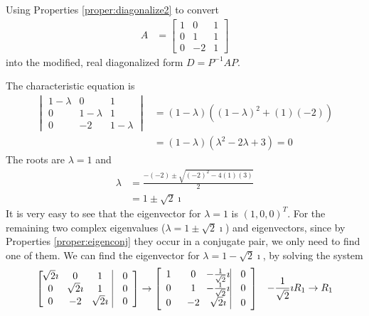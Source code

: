 \begin{exmp}
\label{ex8.2.2}
Using Properties \ref{proper:diagonalize2} to convert
\begin{align*}
A &= 
\begin{bmatrix}
1 & 0 & 1 \\
0 & 1 & 1 \\
0 & -2 & 1
\end{bmatrix}
\end{align*}
into the modified, real diagonalized form $D = P^{-1}AP$.
\end{exmp}
\begin{solution}
The characteristic equation is
\begin{align*}
\begin{vmatrix}
1-\lambda & 0 & 1 \\
0 & 1-\lambda & 1 \\
0 & -2 & 1-\lambda
\end{vmatrix} 
&=
(1-\lambda)((1-\lambda)^2 + (1)(-2)) \\
&= (1-\lambda)(\lambda^2 - 2\lambda + 3) = 0
\end{align*}
The roots are $\lambda = 1$ and
\begin{align*}
\lambda &= \frac{-(-2) \pm \sqrt{(-2)^2 - 4(1)(3)}}{2} \\
&= 1 \pm \sqrt{2}\imath
\end{align*}
It is very easy to see that the eigenvector for $\lambda = 1$ is $(1,0,0)^T$. For the remaining two complex eigenvalues ($\lambda = 1 \pm \sqrt{2}\imath$) and eigenvectors, since by Properties \ref{proper:eigenconj} they occur in a conjugate pair, we only need to find one of them. We can find the eigenvector for $\lambda = 1 - \sqrt{2}\imath$, by solving the system
\begin{align*}
\left[\begin{array}{@{}wc{15pt}wc{15pt}wc{15pt}|wc{15pt}@{}}
\sqrt{2}\imath & 0 & 1 & 0 \\
0 & \sqrt{2}\imath & 1 & 0 \\
0 & -2 & \sqrt{2}\imath & 0
\end{array}\right] &\to  
\left[\begin{array}{@{}wc{15pt}wc{15pt}wc{15pt}|wc{15pt}@{}}
1 & 0 & -\frac{1}{\sqrt{2}}\imath & 0 \\
0 & 1 & -\frac{1}{\sqrt{2}}\imath & 0 \\
0 & -2 & \sqrt{2}\imath & 0
\end{array}\right] & \begin{aligned}
-\frac{1}{\sqrt{2}}\imath R_1 &\to R_1 \\

\end{aligned}
\end{align*}
\end{solution}
